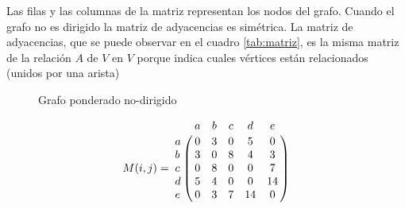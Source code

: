        Las filas y las columnas de la matriz representan los nodos del grafo.
        Cuando el grafo no es dirigido la matriz de adyacencias es simétrica.
        La matriz de adyacencias, que se puede observar en el cuadro \ref{tab:matriz}, es la  misma matriz de la relación $A$ de $V$ en $V$ porque indica cuales v\'ertices están relacionados (unidos por una arista)


        \begin{figure}[!ht]
          \begin{center}


          \end{center}
          \caption{Grafo ponderado no-dirigido}
          \label{fig:grafo_ponderado}
        \end{figure}

        \begin{table}[!ht]
          \label{tab:matriz}
          \begin{center}
            \begin{displaymath}
              M(i,j) =
              \bordermatrix{ ~ & a & b & c & d & e \cr
                             a & 0 & 3 & 0 & 5 & 0 \cr
                             b & 3 & 0 & 8 & 4 & 3 \cr
                             c & 0 & 8 & 0 & 0 & 7 \cr
                             d & 5 & 4 & 0 & 0 & 14\cr
                             e & 0 & 3 & 7 & 14& 0  }
            \end{displaymath}
            \caption{Matriz de adyacencias del grafo de la figura  \ref{fig:grafo_ponderado}}
          \end{center}
        \end{table}


